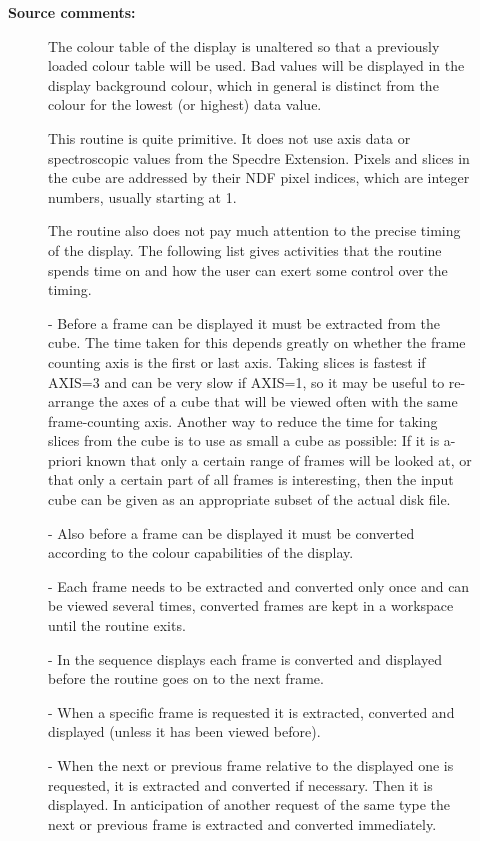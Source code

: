 \begin{description}
\begin{description}
\begin{description}
\end{description}

\item [\textbf{Source comments:}]
\begin{terminalv}
   The colour table of the display is unaltered so that a previously
   loaded colour table will be used. Bad values will be displayed in
   the display background colour, which in general is distinct from
   the colour for the lowest (or highest) data value.

   This routine is quite primitive. It does not use axis data or
   spectroscopic values from the Specdre Extension. Pixels and slices
   in the cube are addressed by their NDF pixel indices, which are
   integer numbers, usually starting at 1.

   The routine also does not pay much attention to the precise timing
   of the display. The following list gives activities that the routine
   spends time on and how the user can exert some control over the
   timing.

   -  Before a frame can be displayed it must be extracted from the
      cube. The time taken for this depends greatly on whether the
      frame counting axis is the first or last axis. Taking slices is
      fastest if AXIS=3 and can be very slow if AXIS=1, so it may be
      useful to re-arrange the axes of a cube that will be viewed
      often with the same frame-counting axis. Another way to reduce
      the time for taking slices from the cube is to use as small a
      cube as possible: If it is a-priori known that only a certain
      range of frames will be looked at, or that only a certain part
      of all frames is interesting, then the input cube can be given
      as an appropriate subset of the actual disk file.

   -  Also before a frame can be displayed it must be converted
      according to the colour capabilities of the display.

   -  Each frame needs to be extracted and converted only once and
      can be viewed several times, converted frames are kept in a
      workspace until the routine exits.

   -  In the sequence displays each frame is converted and displayed
      before the routine goes on to the next frame.

   -  When a specific frame is requested it is extracted, converted
      and displayed (unless it has been viewed before).

   -  When the next or previous frame relative to the displayed one
      is requested, it is extracted and converted if necessary. Then
      it is displayed. In anticipation of another request of the same
      type the next or previous frame is extracted and converted
      immediately.


\end{terminalv}
\end{description}
\end{description}
